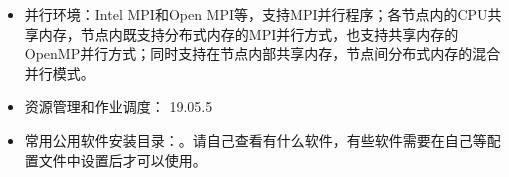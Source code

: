 \documentclass[a4paper,12pt,english]{sphinxmanual}
\begin{document}
\begin{itemize}
\item {} 
\sphinxAtStartPar
并行环境：Intel MPI和Open
MPI等，支持MPI并行程序；各节点内的CPU共享内存，节点内既支持分布式内存的MPI并行方式，也支持共享内存的OpenMP并行方式；同时支持在节点内部共享内存，节点间分布式内存的混合并行模式。

\item {} 
\sphinxAtStartPar
资源管理和作业调度： 19.05.5

\item {} 
\sphinxAtStartPar
常用公用软件安装目录：。请自己查看有什么软件，有些软件需要在自己等配置文件中设置后才可以使用。

\end{itemize}

\begin{figure}[htbp]
\centering

\noindent{}
\end{figure}

\sphinxstepscope
\end{document}
